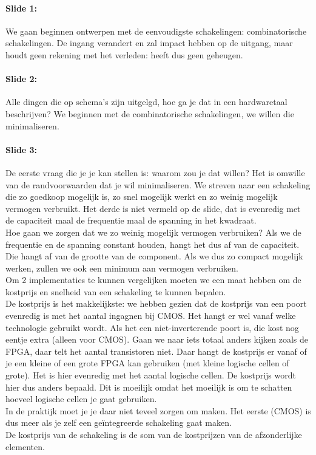 \documentclass[10pt,a4paper]{book}
\begin{document}
\paragraph{Slide 1:} We gaan beginnen ontwerpen met de eenvoudigste schakelingen: combinatorische schakelingen. De ingang verandert en zal impact hebben op de uitgang, maar houdt geen rekening met het verleden: heeft dus geen geheugen.

\paragraph{Slide 2:} Alle dingen die op schema's zijn uitgelgd, hoe ga je dat in een hardwaretaal beschrijven? We beginnen met de combinatorische schakelingen, we willen die minimaliseren.

\paragraph{Slide 3:} De eerste vraag die je je kan stellen is: waarom zou je dat willen? Het is omwille van de randvoorwaarden dat je wil minimaliseren. We streven naar een schakeling die zo goedkoop mogelijk is, zo snel mogelijk werkt en zo weinig mogelijk vermogen verbruikt. Het derde is niet vermeld op de slide, dat is evenredig met de capaciteit maal de frequentie maal de spanning in het kwadraat.\\
Hoe gaan we zorgen dat we zo weinig mogelijk vermogen verbruiken? Als we de frequentie en de spanning constant houden, hangt het dus af van de capaciteit. Die hangt af van de grootte van de component. Als we dus zo compact mogelijk werken, zullen we ook een minimum aan vermogen verbruiken.\\
Om 2 implementaties te kunnen vergelijken moeten we een maat hebben om de kostprijs en snelheid van een schakeling te kunnen bepalen.\\
De kostprijs is het makkelijkste: we hebben gezien dat de kostprijs van een poort evenredig is met het aantal ingagnen bij CMOS. Het hangt er wel vanaf welke technologie gebruikt wordt. Als het een niet-inverterende poort is, die kost nog eentje extra (alleen voor CMOS). Gaan we naar iets totaal anders kijken zoals de FPGA, daar telt het aantal transistoren niet. Daar hangt de kostprijs er vanaf of je een kleine of een grote FPGA kan gebruiken (met kleine logische cellen of grote). Het is hier evenredig met het aantal logische cellen. De kostprijs wordt hier dus anders bepaald. Dit is moeilijk omdat het moeilijk is om te schatten hoeveel logische cellen je gaat gebruiken.\\
In de praktijk moet je je daar niet teveel zorgen om maken. Het eerste (CMOS) is dus meer als je zelf een ge\"integreerde schakeling gaat maken.\\
De kostprijs van de schakeling is de som van de kostprijzen van de afzonderlijke elementen.
\end{document}
